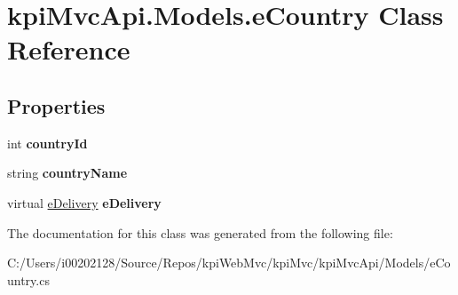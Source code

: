 \hypertarget{classkpi_mvc_api_1_1_models_1_1e_country}{}\section{kpi\+Mvc\+Api.\+Models.\+e\+Country Class Reference}
\label{classkpi_mvc_api_1_1_models_1_1e_country}
\subsection*{Properties}
\begin{DoxyCompactItemize}
\item 
\mbox{\label{classkpi_mvc_api_1_1_models_1_1e_country_a514ea03591f2054a5542c795222acc78}} 
int {\bfseries country\+Id}
\item 
\mbox{\label{classkpi_mvc_api_1_1_models_1_1e_country_ae12d3e0cc04f926c5f18a0742da93bf1}} 
string {\bfseries country\+Name}
\item 
\mbox{\label{classkpi_mvc_api_1_1_models_1_1e_country_a9e3c718ad38b78b9846b0ee49e4ec77c}} 
virtual \hyperlink{classkpi_mvc_api_1_1_models_1_1e_delivery}{e\+Delivery} {\bfseries e\+Delivery}
\end{DoxyCompactItemize}


The documentation for this class was generated from the following file\+:\begin{DoxyCompactItemize}
\item 
C\+:/\+Users/i00202128/\+Source/\+Repos/kpi\+Web\+Mvc/kpi\+Mvc/kpi\+Mvc\+Api/\+Models/e\+Country.\+cs\end{DoxyCompactItemize}
